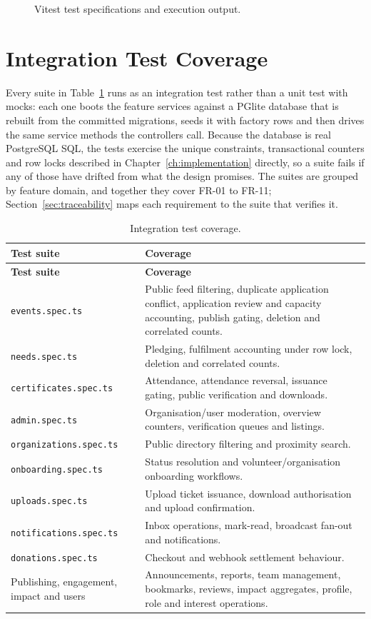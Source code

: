 \begin{figure}[H]
    \centering
    \caption{Vitest test specifications and execution output.}
    \label{fig:testing}
\end{figure}

\section{Integration Test Coverage}
Every suite in Table~\ref{tab:tests} runs as an integration test rather than a unit test with mocks: each one boots the feature services against a PGlite database that is rebuilt from the committed migrations, seeds it with factory rows and then drives the same service methods the controllers call. Because the database is real PostgreSQL SQL, the tests exercise the unique constraints, transactional counters and row locks described in Chapter~\ref{ch:implementation} directly, so a suite fails if any of those have drifted from what the design promises. The suites are grouped by feature domain, and together they cover FR-01 to FR-11; Section~\ref{sec:traceability} maps each requirement to the suite that verifies it.

\begin{longtable}{|p{}|p{}|}
\caption{Integration test coverage.}\label{tab:tests}\\\hline
\textbf{Test suite} & \textbf{Coverage}\\\hline
\endfirsthead
\hline
\textbf{Test suite} & \textbf{Coverage}\\\hline
\endhead
\texttt{events.spec.ts} & Public feed filtering, duplicate application conflict, application review and capacity accounting, publish gating, deletion and correlated counts.\\\hline
\texttt{needs.spec.ts} & Pledging, fulfilment accounting under row lock, deletion and correlated counts.\\\hline
\texttt{certificates.spec.ts} & Attendance, attendance reversal, issuance gating, public verification and downloads.\\\hline
\texttt{admin.spec.ts} & Organisation/user moderation, overview counters, verification queues and listings.\\\hline
\texttt{organizations.spec.ts} & Public directory filtering and proximity search.\\\hline
\texttt{onboarding.spec.ts} & Status resolution and volunteer/organisation onboarding workflows.\\\hline
\texttt{uploads.spec.ts} & Upload ticket issuance, download authorisation and upload confirmation.\\\hline
\texttt{notifications.spec.ts} & Inbox operations, mark-read, broadcast fan-out and notifications.\\\hline
\texttt{donations.spec.ts} & Checkout and webhook settlement behaviour.\\\hline
Publishing, engagement, impact and users & Announcements, reports, team management, bookmarks, reviews, impact aggregates, profile, role and interest operations.\\\hline
\end{longtable}

